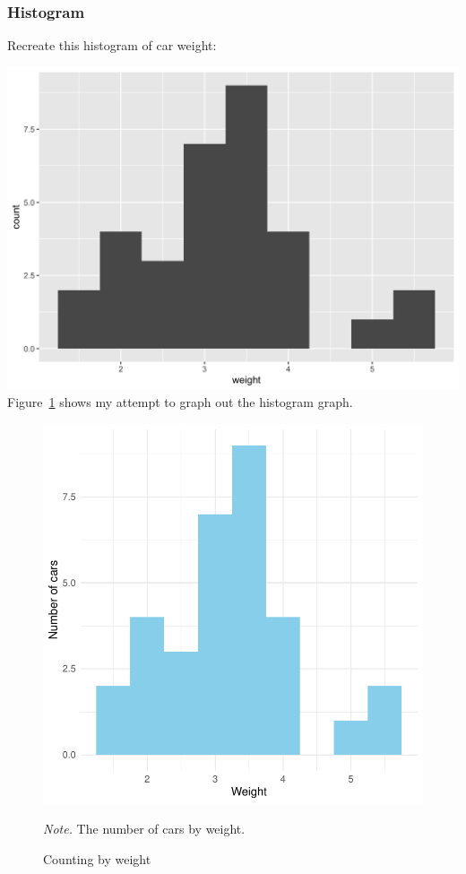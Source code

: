 \documentclass[
  man,
  floatsintext,
  longtable,
  nolmodern,
  notxfonts,
  notimes,
  colorlinks=true,linkcolor=blue,citecolor=blue,urlcolor=blue]{apa7}
\begin{document}
\subsubsection{Histogram}\label{histogram}

Recreate this histogram of car weight:

\includegraphics{plots/plot1.png} Figure~\ref{fig-plot1-histogram} shows
my attempt to graph out the histogram graph.

\begin{figure}[!htbp]

{\caption{{Counting by weight}{\label{fig-plot1-histogram}}}}

\includegraphics{data-visualization_files/figure-pdf/fig-plot1-histogram-1.pdf}

{\noindent \emph{Note.} The number of cars by weight.}

\end{figure}
\end{document}
